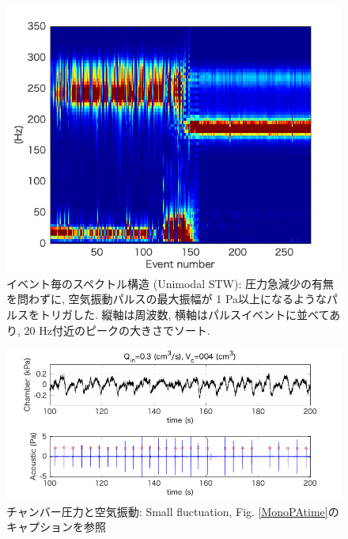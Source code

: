 \documentclass[12pt]{article}
\begin{document}
\begin{figure}[H]
\begin{center}
\includegraphics[scale=1] {Monopspec.png} 
\caption[イベント毎のスペクトル構造: Unimodal STW]
{イベント毎のスペクトル構造 (Unimodal STW): 圧力急減少の有無を問わずに, 空気振動パルスの最大振幅が 1 Pa以上になるようなパルスをトリガした. 縦軸は周波数, 横軸はパルスイベントに並べてあり, 20 Hz付近のピークの大きさでソート.}
\label{Monopspec}
\end{center}
\end{figure} 

\begin{figure}[H]
\begin{center}
\includegraphics[scale=1] {FlctPAtime.png} 
\caption[チャンバー圧力と空気振動: Small fluctuation]
{チャンバー圧力と空気振動: Small fluctuation, Fig. \ref{MonoPAtime}のキャプションを参照}
\label{FlctPAtime}
\end{center}
\end{figure} 
\end{document}

